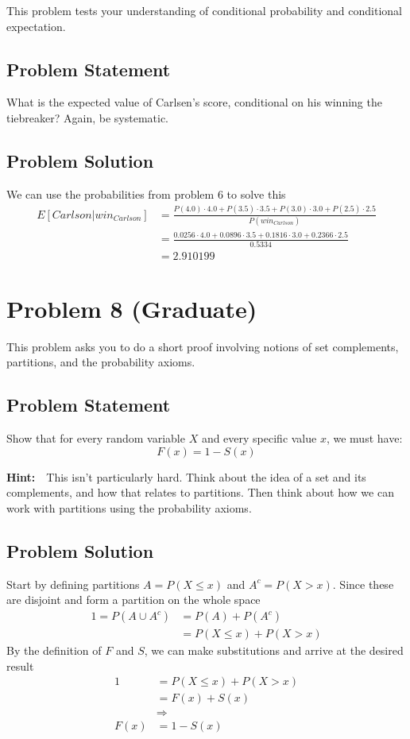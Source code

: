 \documentclass[12pt]{article}
\theoremstyle{definition}
\begin{document}
This problem tests your understanding of conditional probability and conditional expectation.

\subsection*{Problem Statement}

What is the expected value of Carlsen's score, conditional on his winning the tiebreaker? Again, be systematic.

\subsection*{Problem Solution}
We can use the probabilities from problem 6 to solve this
\begin{align*}
E[Carlson|win_{Carlson}] &= \frac{P(4.0)\cdot 4.0 + P(3.5) \cdot 3.5 + P(3.0) \cdot 3.0 + P(2.5) \cdot 2.5}{P(win_{Carlson})}\\
&= \frac{0.0256 \cdot 4.0 + 0.0896 \cdot 3.5 + 0.1816 \cdot 3.0 + 0.2366 \cdot 2.5}{0.5334}\\
&= 2.910199
\end{align*}



\newpage
\section*{Problem 8 (Graduate)}

This problem asks you to do a short proof involving notions of set complements, partitions, and the probability axioms.

\subsection*{Problem Statement}

Show that for every random variable $X$ and every specific value $x$, we must have:
$$
F(x) = 1 - S(x)
$$

\bigskip
\noindent
{\bf Hint:}\ \ This isn't particularly hard. Think about the idea of a set and its complements, and how that relates to partitions. Then think about how we can work with partitions using the probability axioms.



\subsection*{Problem Solution}
Start by defining partitions $A = P(X \leq x)$ and $A^c = P(X > x)$. Since these are disjoint and form a partition on the whole space
\begin{align*}
1 = P(A \cup A^c) &= P(A) + P(A^c)\\
&= P(X \leq x) + P(X > x)
\end{align*}
By the definition of $F$ and $S$, we can make substitutions and arrive at the desired result
\begin{align*}
1 &= P(X \leq x) + P(X > x)\\
&= F(x) + S(x)\\
&\Rightarrow\\
F(x) &= 1 - S(x)
\end{align*}
\end{document}
